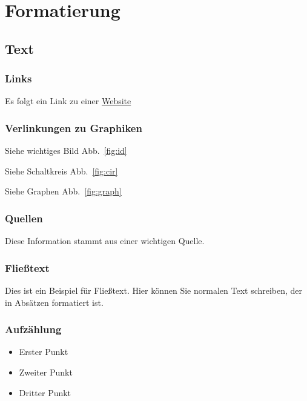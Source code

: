 \documentclass[11pt, paper=A4]{scrartcl} %
\begin{document}

\section{Formatierung}\label{formatierung} %

\subsection{Text}\label{text} %

\subsubsection{Links}\label{links} %

Es folgt ein Link zu einer \href{https://pandoc.org/}{Website}

\subsubsection{Verlinkungen zu Graphiken}\label{verlinkungen-zu-graphiken} %

Siehe wichtiges Bild Abb.~\ref{fig:id}

Siehe Schaltkreis Abb.~\ref{fig:cir}

Siehe Graphen Abb.~\ref{fig:graph}

\subsubsection{Quellen}\label{quellen} %

Diese Information stammt aus einer wichtigen Quelle.

\subsubsection{Fließtext}\label{fließtext} %

Dies ist ein Beispiel für Fließtext. Hier können Sie normalen Text schreiben, der in Absätzen formatiert ist.

\subsubsection{Aufzählung}\label{aufzählung} %

\begin{itemize}
  \item Erster Punkt
  \item Zweiter Punkt
  \item Dritter Punkt
\end{itemize}

\newpage

\AtEndDocument{\theendnotes}
\end{document}
